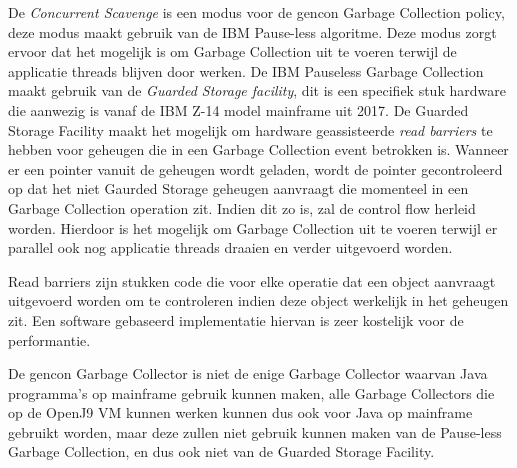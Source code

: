 De \textit{Concurrent Scavenge} is een modus voor de gencon Garbage Collection policy, deze modus maakt gebruik van de IBM Pause-less algoritme. Deze modus zorgt ervoor dat het mogelijk is om Garbage Collection uit te voeren terwijl de  applicatie threads blijven door werken.
De IBM Pauseless Garbage Collection maakt gebruik van de \textit{Guarded Storage facility}, dit is een specifiek stuk hardware die aanwezig is vanaf de IBM Z-14 model mainframe uit 2017.
De Guarded Storage Facility maakt het mogelijk om hardware geassisteerde \textit{read barriers} te hebben voor geheugen die in een Garbage Collection event betrokken is. %
Wanneer er een pointer vanuit de geheugen wordt geladen, wordt de pointer gecontroleerd op dat het niet Gaurded Storage geheugen aanvraagt die momenteel in een Garbage Collection operation zit.
Indien dit zo is, zal de control flow herleid worden. %
Hierdoor is het mogelijk om Garbage Collection uit te voeren terwijl er parallel ook nog applicatie threads draaien en verder uitgevoerd worden.

Read barriers zijn stukken code die voor elke operatie dat een object aanvraagt uitgevoerd worden om te controleren indien deze object werkelijk in het geheugen zit.
Een software gebaseerd implementatie hiervan is zeer kostelijk voor de performantie. %


De gencon Garbage Collector is niet de enige Garbage Collector waarvan Java programma's op mainframe gebruik kunnen maken, alle Garbage Collectors die op de OpenJ9 VM kunnen werken kunnen dus ook voor Java op mainframe gebruikt worden, maar deze zullen niet gebruik kunnen maken van de Pause-less Garbage Collection, en dus ook niet van de Guarded Storage Facility.

